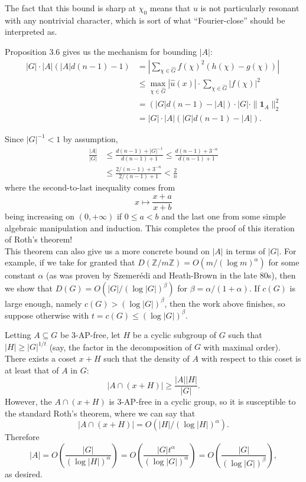 \documentclass[10pt]{scrartcl}
\providecommand{\ZZ}{\mathbb Z}
\providecommand{\ind}[1]{\mathbf 1_{#1}}
\providecommand{\inv}{^{-1}}
\providecommand{\abs}[1]{\left|{#1}\right|}
\renewcommand{\hat}{\widehat}
\providecommand{\norm}[1]{\| #1 \|}
\begin{document}
\begin{remark}
	The fact that this bound is sharp at $\chi_0$
	means that $u$ is not particularly resonant with any nontrivial character,
	which is sort of what ``Fourier-close'' should be interpreted as.
\end{remark}

Proposition 3.6 gives us the mechanism for bounding $|A|$:
\begin{align*}
	|G|\cdot |A|(|A|d(n-1) - 1)
	&= \abs{\sum_{\chi\in\hat G}f(\chi)^2(h(\chi) - g(\chi))}\\
	&\le \max_{\chi\in\hat G}|\hat u(x)|\cdot\sum_{\chi\in\hat G}|f(\chi)|^2\\
	&= (|G|d(n-1)-|A|)\cdot |G|\cdot\norm{\ind A}_2^2\\
	&= |G|\cdot |A|(|G|d(n-1) - |A|).
\end{align*}

Since $|G|\inv < 1$ by assumption,
\begin{align*}
	\frac{|A|}{|G|}&\le \frac{d(n-1) + |G|\inv}{d(n-1)+1}
	\le \frac{d(n-1) + 3^{-n}}{d(n-1) + 1}\\
	&\le \frac{2/(n-1) + 3^{-n}}{2/(n-1) + 1} < \frac 2n
\end{align*}
where the second-to-last inequality comes from
\[x\mapsto \frac{x+a}{x+b}\]
being increasing on $(0,+\infty)$ if $0 \le a < b$
and the last one from some simple algebraic manipulation and induction.
This completes the proof of this iteration of Roth's theorem!\\

This theorem can also give us a more concrete bound on $|A|$ in terms of $|G|$.
For example, if we take for granted that $D(\ZZ/m\ZZ) = O(m/(\log m)^\alpha)$
for some constant $\alpha$ (as was proven by Szemer\'edi and Heath-Brown
in the late 80s), then we show that $D(G) = O(|G|/(\log |G|)^\beta)$
for $\beta = \alpha/(1+\alpha)$. If $c(G)$ is large enough,
namely $c(G) > (\log |G|)^\beta$, then the work above finishes,
so suppose otherwise with $t = c(G) \le (\log |G|)^\beta$.

Letting $A\subseteq G$ be 3-AP-free, let $H$ be a cyclic subgroup of $G$
such that $|H|\ge |G|^{1/t}$ (say, the factor in the decomposition of $G$
with maximal order). There exists a coset $x+H$ such that
the density of $A$ with respect to this coset is at least that of $A$ in $G$:
\[|A\cap(x+H)|\ge \frac{|A||H|}{|G|}.\]
However, the $A\cap(x+H)$ is 3-AP-free in a cyclic group,
so it is susceptible to the standard Roth's theorem,
where we can say that
\[|A\cap (x+H)| = O(|H|/(\log |H|)^\alpha).\]
Therefore
\[|A| = O\left(\frac{|G|}{(\log |H|)^\alpha}\right)
= O\left(\frac{|G|t^\alpha}{(\log |G|)^\alpha}\right)
= O\left(\frac{|G|}{(\log |G|)^\beta}\right),\]
as desired.
\end{document}
